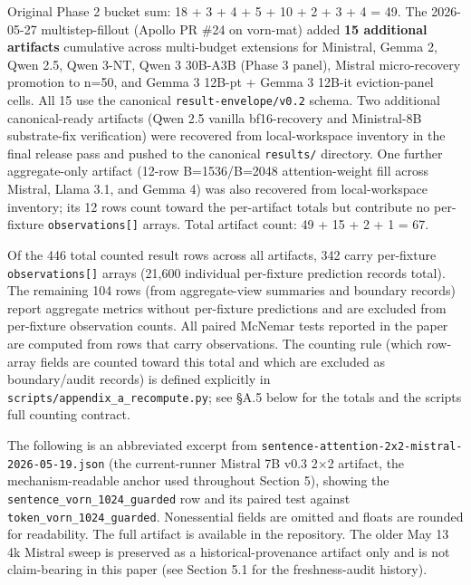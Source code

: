 \documentclass[
]{article}
\begin{document}
Original Phase 2 bucket sum: 18 + 3 + 4 + 5 + 10 + 2 + 3 + 4 = 49. The
2026-05-27 multistep-fillout (Apollo PR \#24 on vorn-mat) added
\textbf{15 additional artifacts} cumulative across multi-budget
extensions for Ministral, Gemma 2, Qwen 2.5, Qwen 3-NT, Qwen 3 30B-A3B
(Phase 3 panel), Mistral micro-recovery promotion to n=50, and
Gemma 3 12B-pt + Gemma 3 12B-it eviction-panel cells. All 15 use the
canonical \texttt{result-envelope/v0.2} schema. Two additional
canonical-ready artifacts (Qwen 2.5 vanilla bf16-recovery and
Ministral-8B substrate-fix verification) were recovered from
local-workspace inventory in the final release pass and pushed to
the canonical \texttt{results/} directory. One further aggregate-only
artifact (12-row B=1536/B=2048 attention-weight fill across Mistral,
Llama 3.1, and Gemma 4) was also recovered from local-workspace
inventory; its 12 rows count toward the per-artifact totals but
contribute no per-fixture \texttt{observations{[}{]}} arrays. Total
artifact count: 49 + 15 + 2 + 1 = 67.

Of the 446 total counted result rows across all artifacts, 342 carry
per-fixture \texttt{observations{[}{]}} arrays (21,600 individual
per-fixture prediction records total). The remaining 104 rows (from
aggregate-view summaries and boundary records) report aggregate metrics
without per-fixture predictions and are excluded from per-fixture
observation counts. All paired McNemar tests reported in the paper are computed
from rows that carry observations. The counting rule (which row-array
fields are counted toward this total and which are excluded as
boundary/audit records) is defined explicitly in
\texttt{scripts/\allowbreak{}appendix\_a\_recompute.\allowbreak{}py}; see §A.5 below for the
totals and the script\textquotesingle s full counting contract.

The following is an abbreviated excerpt from
\texttt{sentence-attention-2x2-mistral-2026-05-19.\allowbreak{}json} (the
current-runner Mistral 7B v0.3 2×2 artifact, the mechanism-readable
anchor used throughout Section 5), showing the
\texttt{sentence\_vorn\_1024\_guarded} row and its paired test against
\texttt{token\_vorn\_1024\_guarded}. Nonessential fields are omitted and
floats are rounded for readability. The full artifact is available in
the repository. The older May 13 4k Mistral sweep is preserved as a
historical-provenance artifact only and is not claim-bearing in this
paper (see Section 5.1 for the freshness-audit history).
\end{document}
